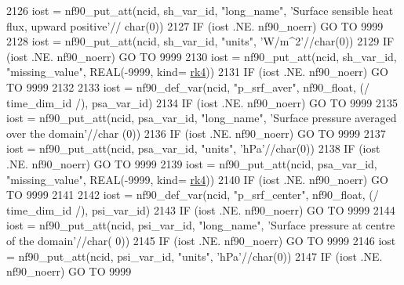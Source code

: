 \begin{DoxyCode}
{2126     iost    = nf90\_put\_att(ncid, sh\_var\_id, \textcolor{stringliteral}{"long\_name"}, \textcolor{stringliteral}{'Surface sensible heat flux, upward positive'}//
      char(0))
2127     \textcolor{keywordflow}{IF} (iost .NE. nf90\_noerr) \textcolor{keywordflow}{GO TO} 9999
2128     iost    = nf90\_put\_att(ncid, sh\_var\_id, \textcolor{stringliteral}{"units"}, \textcolor{stringliteral}{'W/m^2'}//char(0))
2129     \textcolor{keywordflow}{IF} (iost .NE. nf90\_noerr) \textcolor{keywordflow}{GO TO} 9999
2130     iost    = nf90\_put\_att(ncid, sh\_var\_id, \textcolor{stringliteral}{"missing\_value"}, \textcolor{keywordtype}{REAL}(-9999, kind=
      \hyperlink{namespaceportable_abaed22a509442771d3fba69bebda0b33}{rk4}))
2131     \textcolor{keywordflow}{IF} (iost .NE. nf90\_noerr) \textcolor{keywordflow}{GO TO} 9999
2132 
2133     iost    = nf90\_def\_var(ncid, \textcolor{stringliteral}{"p\_srf\_aver"}, nf90\_float, (/ time\_dim\_id /), psa\_var\_id)
2134     \textcolor{keywordflow}{IF} (iost .NE. nf90\_noerr) \textcolor{keywordflow}{GO TO} 9999
2135     iost    = nf90\_put\_att(ncid, psa\_var\_id, \textcolor{stringliteral}{"long\_name"}, \textcolor{stringliteral}{'Surface pressure averaged over the domain'}//char
      (0))
2136     \textcolor{keywordflow}{IF} (iost .NE. nf90\_noerr) \textcolor{keywordflow}{GO TO} 9999
2137     iost    = nf90\_put\_att(ncid, psa\_var\_id, \textcolor{stringliteral}{"units"}, \textcolor{stringliteral}{'hPa'}//char(0))
2138     \textcolor{keywordflow}{IF} (iost .NE. nf90\_noerr) \textcolor{keywordflow}{GO TO} 9999
2139     iost    = nf90\_put\_att(ncid, psa\_var\_id, \textcolor{stringliteral}{"missing\_value"}, \textcolor{keywordtype}{REAL}(-9999, kind=
      \hyperlink{namespaceportable_abaed22a509442771d3fba69bebda0b33}{rk4}))
2140     \textcolor{keywordflow}{IF} (iost .NE. nf90\_noerr) \textcolor{keywordflow}{GO TO} 9999
2141 
2142     iost    = nf90\_def\_var(ncid, \textcolor{stringliteral}{"p\_srf\_center"}, nf90\_float, (/ time\_dim\_id /), psi\_var\_id)
2143     \textcolor{keywordflow}{IF} (iost .NE. nf90\_noerr) \textcolor{keywordflow}{GO TO} 9999
2144     iost    = nf90\_put\_att(ncid, psi\_var\_id, \textcolor{stringliteral}{"long\_name"}, \textcolor{stringliteral}{'Surface pressure at centre of the domain'}//char(
      0))
2145     \textcolor{keywordflow}{IF} (iost .NE. nf90\_noerr) \textcolor{keywordflow}{GO TO} 9999
2146     iost    = nf90\_put\_att(ncid, psi\_var\_id, \textcolor{stringliteral}{"units"}, \textcolor{stringliteral}{'hPa'}//char(0))
2147     \textcolor{keywordflow}{IF} (iost .NE. nf90\_noerr) \textcolor{keywordflow}{GO TO} 9999
}
\end{DoxyCode}
